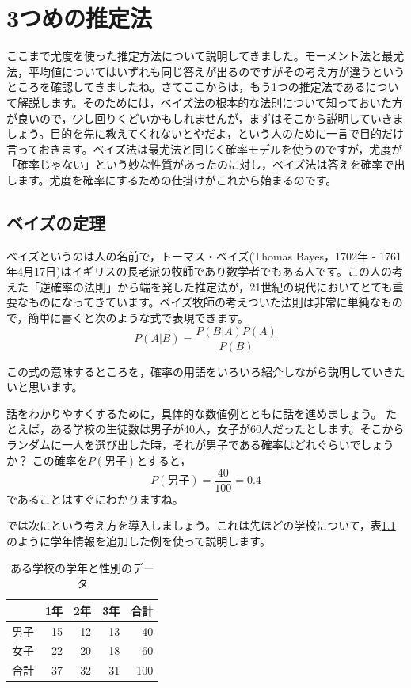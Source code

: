 \documentclass{ltjbook}
\begin{document}
\VerbatimFootnotes

\chapter{3つめの推定法}
\label{ch25_bayesian_intro}

ここまで尤度を使った推定方法について説明してきました。モーメント法と最尤法，平均値についてはいずれも同じ答えが出るのですがその考え方が違うというところを確認してきましたね。さてここからは，もう1つの推定法であるについて解説します。そのためには，ベイズ法の根本的な法則について知っておいた方が良いので，少し回りくどいかもしれませんが，まずはそこから説明していきましょう。目的を先に教えてくれないとやだよ，という人のために一言で目的だけ言っておきます。ベイズ法は最尤法と同じく確率モデルを使うのですが，尤度が「確率じゃない」という妙な性質があったのに対し，ベイズ法は答えを確率で出します。尤度を確率にするための仕掛けがこれから始まるのです。
\section{ベイズの定理}
ベイズというのは人の名前で，トーマス・ベイズ(Thomas Bayes，1702年 - 1761年4月17日)はイギリスの長老派の牧師であり数学者でもある人です。この人の考えた「逆確率の法則」から端を発した推定法が，21世紀の現代においてとても重要なものになってきています。ベイズ牧師の考えついた法則は非常に単純なもので，簡単に書くと次のような式で表現できます。
\[ P(A|B) = \frac{P(B|A)P(A)}{P(B)} \]

この式の意味するところを，確率の用語をいろいろ紹介しながら説明していきたいと思います。

話をわかりやすくするために，具体的な数値例とともに話を進めましょう。
たとえば，ある学校の生徒数は男子が40人，女子が60人だったとします。そこからランダムに一人を選び出した時，それが男子である確率はどれぐらいでしょうか？ この確率を$P(\mbox{男子})$とすると，
\[P(\mbox{男子})=\frac{40}{100}=0.4 \]
であることはすぐにわかりますね。

では次にという考え方を導入しましょう。これは先ほどの学校について，表\ref{tbl:25_01}のように学年情報を追加した例を使って説明します。

\begin{table}[ht]
	\centering
	\caption{ある学校の学年と性別のデータ}
	\begin{tabular}{rrrrr}
		\hline
		   & 1年 & 2年 & 3年 & 合計  \\
		\hline
		男子 & 15 & 12 & 13 & 40  \\
		女子 & 22 & 20 & 18 & 60  \\\hline
		合計 & 37 & 32 & 31 & 100 \\\hline
	\end{tabular}
	\label{tbl:25_01}
\end{table}
\end{document}
